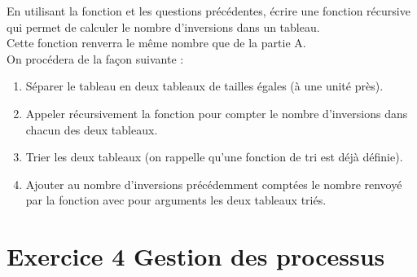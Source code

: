 \documentclass[a4paper,12pt,french]{book}
\begin{document}
\begin{enumerate}[\bfseries 1.]
En utilisant la fonction  et les questions précédentes, écrire une fonction
récursive  qui permet de calculer le nombre d'inversions
dans un tableau.\\
Cette fonction renverra le même nombre que  de la partie A.\\
On procédera de la façon suivante :
\begin{enumerate}[--]
	\item 	Séparer le tableau en deux tableaux de tailles égales (à une unité près).
	\item 	Appeler récursivement la fonction  pour compter le nombre
    d’inversions dans chacun des deux tableaux.
    \item   Trier les deux tableaux (on rappelle qu'une fonction de tri est déjà définie).
    \item   Ajouter au nombre d'inversions précédemment comptées le nombre renvoyé par la
    fonction  avec pour arguments les deux tableaux triés.
\end{enumerate}
\end{enumerate}

\section*{Exercice 4 \small{\hfill Gestion des processus}}
\end{document}
